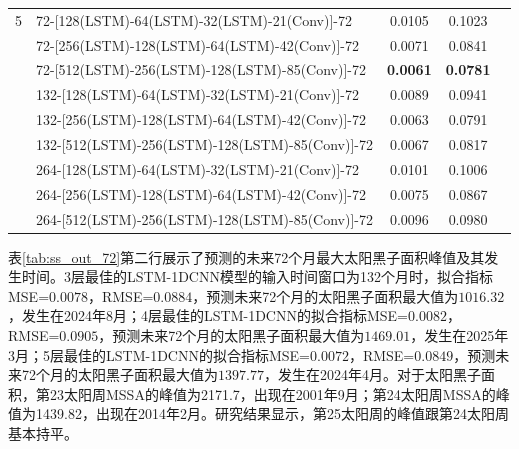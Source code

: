 \begin{table}[!htbp]
\begin{tabular}{clccc}
    \hline
    5 & 72-[128(LSTM)-64(LSTM)-32(LSTM)-21(Conv)]-72 & 0.0105 & 0.1023 \\
      & 72-[256(LSTM)-128(LSTM)-64(LSTM)-42(Conv)]-72 & 0.0071 & 0.0841 \\
      & 72-[512(LSTM)-256(LSTM)-128(LSTM)-85(Conv)]-72 & \textbf{0.0061} & \textbf{0.0781} \\
      & 132-[128(LSTM)-64(LSTM)-32(LSTM)-21(Conv)]-72 & 0.0089 & 0.0941 \\
      & 132-[256(LSTM)-128(LSTM)-64(LSTM)-42(Conv)]-72 & 0.0063 & 0.0791 \\
      & 132-[512(LSTM)-256(LSTM)-128(LSTM)-85(Conv)]-72 & 0.0067 & 0.0817 \\
      & 264-[128(LSTM)-64(LSTM)-32(LSTM)-21(Conv)]-72 & 0.0101 & 0.1006 \\
      & 264-[256(LSTM)-128(LSTM)-64(LSTM)-42(Conv)]-72 & 0.0075 & 0.0867 \\
      & 264-[512(LSTM)-256(LSTM)-128(LSTM)-85(Conv)]-72 & 0.0096 & 0.0980 \\
    \bottomrule
\end{tabular}
\end{table}

表\ref{tab:ss_out_72}第二行展示了预测的未来72个月最大太阳黑子面积峰值及其发生时间。3层最佳的LSTM-1DCNN模型的输入时间窗口为132个月时，拟合指标MSE=$0.0078$，RMSE=$0.0884$，预测未来72个月的太阳黑子面积最大值为$1016.32$，发生在2024年8月；4层最佳的LSTM-1DCNN的拟合指标MSE=$0.0082$，RMSE=$0.0905$，预测未来72个月的太阳黑子面积最大值为$1469.01$，发生在2025年3月；5层最佳的LSTM-1DCNN的拟合指标MSE=$0.0072$，RMSE=$0.0849$，预测未来72个月的太阳黑子面积最大值为$1397.77$，发生在2024年4月。对于太阳黑子面积，第23太阳周MSSA的峰值为2171.7，出现在2001年9月；第24太阳周MSSA的峰值为1439.82，出现在2014年2月。研究结果显示，第25太阳周的峰值跟第24太阳周基本持平。 

